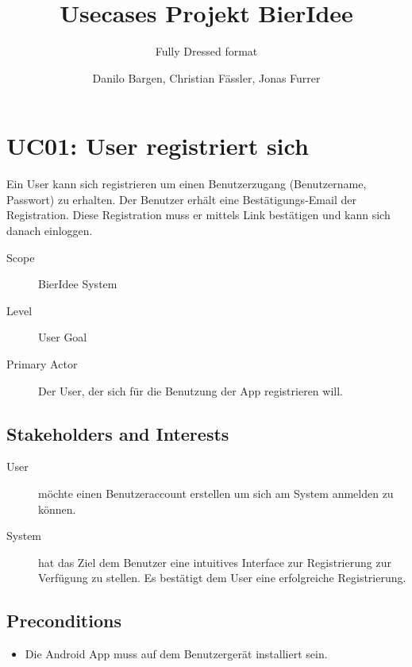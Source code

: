 \documentclass[10pt,a4paper]{scrartcl}
\author{Danilo Bargen, Christian Fässler, Jonas Furrer}
\title{Usecases Projekt BierIdee}
\subtitle{Fully Dressed format}
\begin{document}
\begin{titlepage}
	\maketitle
	\vspace{120mm}
	\thispagestyle{empty} %
\end{titlepage}



\section*{UC01: User registriert sich }

Ein User kann sich registrieren um einen Benutzerzugang (Benutzername, Passwort) zu erhalten. Der Benutzer erhält eine Bestätigungs-Email der Registration.
Diese Registration muss er mittels Link bestätigen und kann sich danach einloggen.



\begin{description}
\item[Scope] BierIdee System
\item[Level] User Goal
\item[Primary Actor] Der User, der sich für die Benutzung der App registrieren will.
\end{description}


\subsection*{Stakeholders and Interests}

\begin{description}
\item[User] möchte einen Benutzeraccount erstellen um sich am System anmelden zu können.
\item[System] hat das Ziel dem Benutzer eine intuitives Interface zur Registrierung zur Verfügung zu stellen. Es bestätigt dem User eine erfolgreiche Registrierung.
\end{description}


\subsection*{Preconditions}

\begin{itemize}
\item Die Android App muss auf dem Benutzergerät installiert sein.
\end{itemize}
\end{document}
